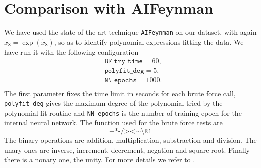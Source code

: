\documentclass[11pt,a4paper]{article}
\begin{document}
\section{Comparison with AIFeynman}
We have used the state-of-the-art technique \texttt{AIFeynman} \cite{Udrescu:2019mnk} on our dataset, with again $x_8 = \exp(\tilde{x}_8)$, so as to identify polynomial expressions fitting the data. We have run it with the following configuration 
\begin{equation}
	\begin{aligned}
		&\texttt{BF\_try\_time} = 60, \\
		&\texttt{polyfit\_deg} = 5, \\
		&\texttt{NN\_epochs} = 1000.\\
	\end{aligned}
\end{equation}
The first parameter fixes the time limit in seconds for each brute force call, \texttt{polyfit\_deg} gives the maximum degree of the polynomial tried by the polynomial fit routine and \texttt{NN\_epochs} is the number of training epoch for the internal neural network. The function used for the brute force tests are 
\begin{equation}
\texttt{+*-/><} \sim \texttt{\textbackslash R1}
\end{equation}
The binary operations are addition, multiplication, substraction and division. The unary ones are inverse, increment, decrement, negation and square root. Finally there is a nonary one, the unity. For more details we refer to \cite{Udrescu:2019mnk}.
\end{document}
